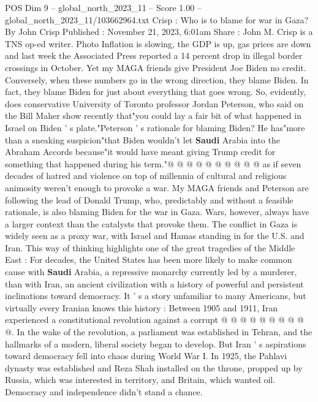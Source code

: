 \begin{textsample}{POS Dim 9 – global\_north\_2023\_11 – Score 1.00 – global\_north\_2023\_11/103662964.txt}  \label{ex:f9_pos_381}
Crisp : Who is to blame for war in Gaza?
By John Crisp Published : November 21, 2023, 6:01am Share : John M.
Crisp is a TNS op-ed writer.
Photo Inflation is slowing, the GDP is up, gas prices are down and last week the Associated Press reported a 14 percent drop in illegal border crossings in October.
Yet my MAGA friends give President Joe Biden no credit.
Conversely, when these numbers go in the wrong direction, they blame Biden.
In fact, they blame Biden for just about everything that goes wrong.
So, evidently, does conservative University of Toronto professor Jordan Peterson, who said on the Bill Maher show recently that"you could lay a fair bit of what happened in Israel on Biden ' s plate."Peterson ' s rationale for blaming Biden?
He has"more than a sneaking suspicion"that Biden wouldn't let \textbf{Saudi} Arabia into the Abraham Accords because"it would have meant giving Trump credit for something that happened during his term."@ @ @ @ @ @ @ @ @ @ as if seven decades of hatred and violence on top of millennia of cultural and religious animosity weren't enough to provoke a war.
My MAGA friends and Peterson are following the lead of Donald Trump, who, predictably and without a feasible rationale, is also blaming Biden for the war in Gaza.
Wars, however, always have a larger context than the catalysts that provoke them.
The conflict in Gaza is widely seen as a proxy war, with Israel and Hamas standing in for the U.S. and Iran.
This way of thinking highlights one of the great tragedies of the Middle East : For decades, the United States has been more likely to make common cause with \textbf{Saudi} Arabia, a repressive monarchy currently led by a murderer, than with Iran, an ancient civilization with a history of powerful and persistent inclinations toward democracy.
It ' s a story unfamiliar to many Americans, but virtually every Iranian knows this history : Between 1905 and 1911, Iran experienced a constitutional revolution against a corrupt @ @ @ @ @ @ @ @ @ @.
In the wake of the revolution, a parliament was established in Tehran, and the hallmarks of a modern, liberal society began to develop.
But Iran ' s aspirations toward democracy fell into chaos during World War I.
In 1925, the Pahlavi dynasty was established and Reza Shah installed on the throne, propped up by Russia, which was interested in territory, and Britain, which wanted oil.
Democracy and independence didn't stand a chance.

\end{textsample}
